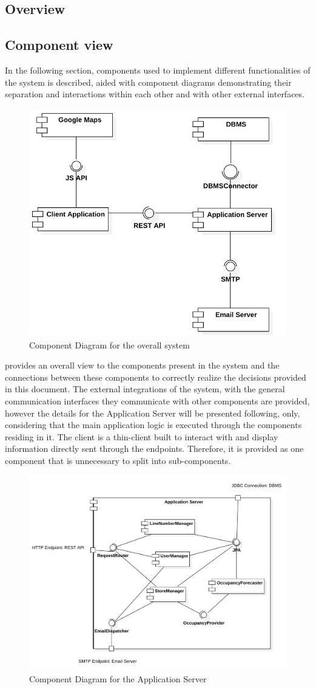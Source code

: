 \subsection{Overview}
\subsection{Component view}
In the following section, components used to implement different functionalities of the system is described, aided with component diagrams demonstrating their separation and interactions within each other and with other external interfaces.
\begin{figure}[H]
    \centering
    \includegraphics[height=0.4\textwidth]{Images/ComponentDiagrams/Overall.png}
    \caption{Component Diagram for the overall system}
    \label{fig:CDOverall}
\end{figure}
 provides an overall view to the components present in the system and the connections between these components to correctly realize the decisions provided in this document.
The external integrations of the system, with the general communication interfaces they communicate with other components are provided, however the details for the Application Server will be presented following, only, considering that the main application logic is executed through the components residing in it.
The client is a thin-client built to interact with and display information directly sent through the endpoints.
Therefore, it is provided as one component that is unnecessary to split into sub-components.
\begin{figure}[H]
    \centering
    \includegraphics[height=0.4\textwidth]{Images/ComponentDiagrams/ApplicationServer.png}
    \caption{Component Diagram for the Application Server}
    \label{fig:CDApplicationServer}
\end{figure}
